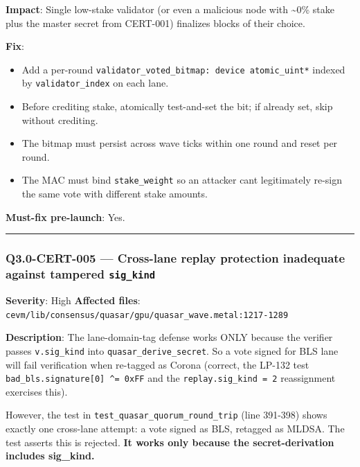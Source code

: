 \documentclass[
]{article}
\providecommand{\tightlist}{%
  \setlength{\itemsep}{0pt}\setlength{\parskip}{0pt}}
\begin{document}
\textbf{Impact}: Single low-stake validator (or even a malicious node
with \textasciitilde0\% stake plus the master secret from CERT-001)
finalizes blocks of their choice.

\textbf{Fix}:

\begin{itemize}
\tightlist
\item
  Add a per-round
  \texttt{validator\_voted\_bitmap:\ device\ atomic\_uint*} indexed by
  \texttt{validator\_index} on each lane.
\item
  Before crediting stake, atomically test-and-set the bit; if already
  set, skip without crediting.
\item
  The bitmap must persist across wave ticks within one round and reset
  per round.
\item
  The MAC must bind \texttt{stake\_weight} so an attacker
  can\textquotesingle t legitimately re-sign the same vote with
  different stake amounts.
\end{itemize}

\textbf{Must-fix pre-launch}: Yes.

\begin{center}\rule{0.5\linewidth}{0.5pt}\end{center}

\subsubsection{\texorpdfstring{Q3.0-CERT-005 --- Cross-lane replay
protection inadequate against tampered
\texttt{sig\_kind}}{Q3.0-CERT-005 --- Cross-lane replay protection inadequate against tampered sig\_kind}}\label{q30-cert-005--cross-lane-replay-protection-inadequate-against-tampered-sig_kind}

\textbf{Severity}: High \textbf{Affected files}:
\texttt{cevm/lib/consensus/quasar/gpu/quasar\_wave.metal:1217-1289}

\textbf{Description}: The lane-domain-tag defense works ONLY because the
verifier passes \texttt{v.sig\_kind} into
\texttt{quasar\_derive\_secret}. So a vote signed for BLS lane will fail
verification when re-tagged as Corona (correct, the LP-132 test
\texttt{bad\_bls.signature{[}0{]}\ \^{}=\ 0xFF} and the
\texttt{replay.sig\_kind\ =\ 2} reassignment exercises this).

However, the test in \texttt{test\_quasar\_quorum\_round\_trip} (line
391-398) shows exactly one cross-lane attempt: a vote signed as BLS,
retagged as MLDSA. The test asserts this is rejected. \textbf{It works
only because the secret-derivation includes sig\_kind.}
\end{document}
